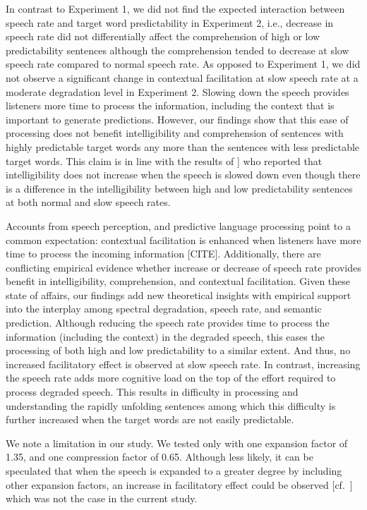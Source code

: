 \documentclass[a4paper, nobind]{templates/ociamthesis}
\begin{document}
In contrast to Experiment 1, we did not find the expected interaction between speech rate and target word predictability in Experiment 2,
i.e., decrease in speech rate did not differentially affect the comprehension of high or low predictability sentences although the comprehension tended to decrease at slow speech rate compared to normal speech rate.
As opposed to Experiment 1, we did not observe a significant change in contextual facilitation at slow speech rate at a moderate degradation level in Experiment 2.
Slowing down the speech provides listeners more time to process the information, including the context that is important to generate predictions.
However, our findings show that this ease of processing does not benefit intelligibility and comprehension of sentences with highly predictable target words any more than the sentences with less predictable target words.
This claim is in line with the results of \textcite{Winn2021b}{]} who reported that intelligibility does not increase when the speech is slowed down even though there is a difference in the intelligibility between high and low predictability sentences at both normal and slow speech rates.

Accounts from speech perception, and predictive language processing point to a common expectation: contextual facilitation is enhanced when listeners have more time to process the incoming information {[}CITE{]}.
Additionally, there are conflicting empirical evidence whether increase or decrease of speech rate provides benefit in intelligibility, comprehension, and contextual facilitation.
Given these state of affairs, our findings add new theoretical insights with empirical support into the interplay among spectral degradation, speech rate, and semantic prediction.
Although reducing the speech rate provides time to process the information (including the context) in the degraded speech, this eases the processing of both high and low predictability to a similar extent.
And thus, no increased facilitatory effect is observed at slow speech rate. In contrast, increasing the speech rate adds more cognitive load on the top of the effort required to process degraded speech.
This results in difficulty in processing and understanding the rapidly unfolding sentences among which this difficulty is further increased when the target words are not easily predictable.

We note a limitation in our study. We tested only with one expansion factor of 1.35, and one compression factor of 0.65.
Although less likely, it can be speculated that when the speech is expanded to a greater degree by including other expansion factors, an increase in facilitatory effect could be observed {[}cf.~{]} which was not the case in the current study.
\end{document}
